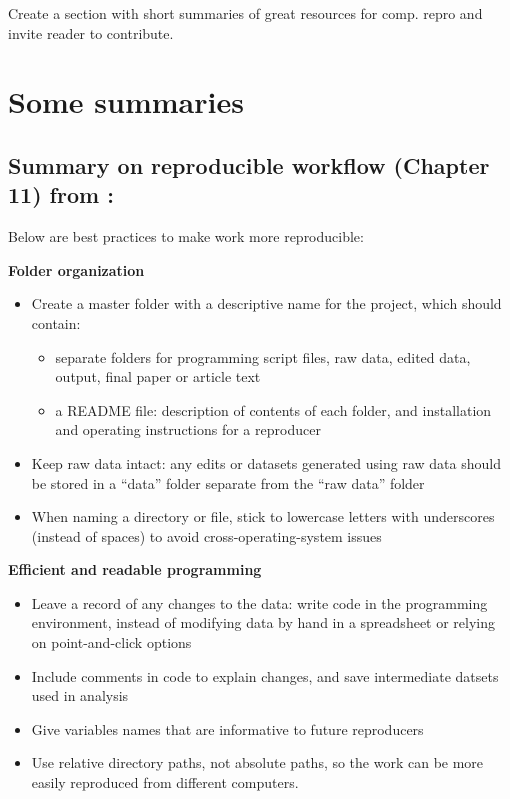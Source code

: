 \documentclass[]{book}
\providecommand{\tightlist}{%
  \setlength{\itemsep}{0pt}\setlength{\parskip}{0pt}}
\begin{document}
Create a section with short summaries of great resources for comp. repro and invite reader to contribute.

\hypertarget{some-summaries}{%
\section{Some summaries}\label{some-summaries}}

\hypertarget{summary-on-reproducible-workflow-chapter-11-from-christensen2019transparent}{%
\subsection{\texorpdfstring{Summary on reproducible workflow (Chapter 11) from \citet{christensen2019transparent}:}{Summary on reproducible workflow (Chapter 11) from @christensen2019transparent:}}\label{summary-on-reproducible-workflow-chapter-11-from-christensen2019transparent}}

Below are best practices to make work more reproducible:

\textbf{Folder organization}

\begin{itemize}
\tightlist
\item
  Create a master folder with a descriptive name for the project, which should contain:

  \begin{itemize}
  \tightlist
  \item
    separate folders for programming script files, raw data, edited data, output, final paper or article text
  \item
    a README file: description of contents of each folder, and installation and operating instructions for a reproducer
  \end{itemize}
\item
  Keep raw data intact: any edits or datasets generated using raw data should be stored in a ``data'' folder separate from the ``raw data'' folder
\item
  When naming a directory or file, stick to lowercase letters with underscores (instead of spaces) to avoid cross-operating-system issues
\end{itemize}

\textbf{Efficient and readable programming}

\begin{itemize}
\tightlist
\item
  Leave a record of any changes to the data: write code in the programming environment, instead of modifying data by hand in a spreadsheet or relying on point-and-click options
\item
  Include comments in code to explain changes, and save intermediate datsets used in analysis
\item
  Give variables names that are informative to future reproducers
\item
  Use relative directory paths, not absolute paths, so the work can be more easily reproduced from different computers.
\end{itemize}
\end{document}
